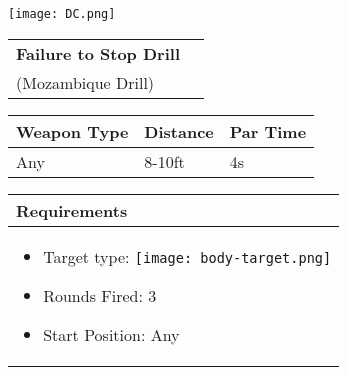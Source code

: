 \documentclass[../Cover.tex]{subfiles}
\begin{document}
	\begin{minipage}[t][0.15\textheight][t]{0.15\textwidth} 
		\texttt{[image: DC.png]}
	\end{minipage}
	\hfill
	\begin{minipage}[t][0.15\textheight][t]{0.8\textwidth}
		\begin{tabular}{ p{} l  }			
			\textbf{Failure to Stop Drill} \\
			\small (Mozambique Drill)\\[0.09\textheight]
		\end{tabular}
		\quad
		\begin{tabular}{ | p{} | p{} | p{} |}
			\hline
			\tiny Weapon Type & \tiny Distance & \tiny Par Time\\ 
			\hline
			\tiny Any& \tiny 8-10ft & \tiny 4s \\ 
			\hline
		\end{tabular}
	\end{minipage}
	\begin{tabular}{p{0.25\textwidth}}
		\small Requirements \\
		\hline
		\tiny \begin{itemize}
			\item Target type: \texttt{[image: body-target.png]}
			\item Rounds Fired: 3
			\item Start Position: Any
		\end{itemize}				
		\\[0.6\textheight]
	\end{tabular}
\end{document}
